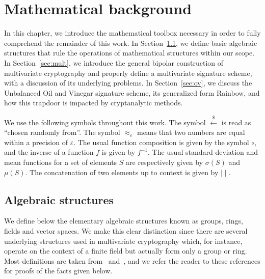 \documentclass[draft, 12pt, a4paper, oneside]{memoir}
\newcommand{\random}{\stackrel{\$}{\longleftarrow}}
\theoremstyle{definition}
\begin{document}

\chapter{Mathematical background}\label{chapter:math}

In this chapter, we introduce the mathematical toolbox necessary in order to fully comprehend the remainder of this work. In Section~\ref{sec:algebra}, we define basic algebraic structures that rule the operations of mathematical structures within our scope. In Section~\ref{sec:mult}, we introduce the general bipolar construction of multivariate cryptography and properly define a multivariate signature scheme, with a discussion of its underlying problems. In Section~\ref{sec:ov}, we discuss the Unbalanced Oil and Vinegar signature scheme, its generalized form Rainbow, and how this trapdoor is impacted by cryptanalytic methods.

We use the following symbols throughout this work. The symbol $\random$ is read as ``chosen randomly from''. The symbol $\approx_{\varepsilon}$ means that two numbers are equal within a precision of $\varepsilon$. The usual function composition is given by the symbol $\circ$, and the inverse of a function $f$ is given by $f^{-1}$. The usual standard deviation and mean functions for a set of elements $S$ are respectively given by $\sigma(S)$ and $\mu(S)$. The concatenation of two elements up to context is given by $\mid\mid$.

\section{Algebraic structures}\label{sec:algebra}

We define below the elementary algebraic structures known as groups, rings, fields and vector spaces. We make this clear distinction since there are several underlying structures used in multivariate cryptography which, for instance, operate on the context of a finite field but actually form only a group or ring. Most definitions are taken from~\cite{Dummit:2003} and~\cite{Mullen:2013}, and we refer the reader to these references for proofs of the facts given below.
\end{document}
